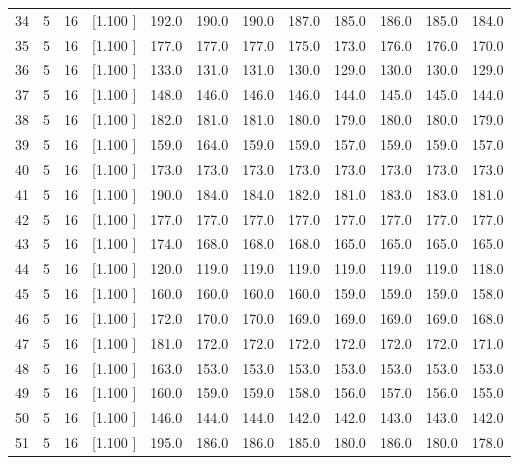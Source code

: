\documentclass[12pt,a4paper]{article}
\begin{document}
\begin{center}
{\begin{tabular}{r r r r r r r r r r r r}
  34&  5& 16&[1.100     ]&   192.0&   190.0&   190.0&   187.0&   185.0&   186.0&   185.0&   184.0\\[-0.02in]
  35&  5& 16&[1.100     ]&   177.0&   177.0&   177.0&   175.0&   173.0&   176.0&   176.0&   170.0\\[-0.02in]
  36&  5& 16&[1.100     ]&   133.0&   131.0&   131.0&   130.0&   129.0&   130.0&   130.0&   129.0\\[-0.02in]
  37&  5& 16&[1.100     ]&   148.0&   146.0&   146.0&   146.0&   144.0&   145.0&   145.0&   144.0\\[-0.02in]
  38&  5& 16&[1.100     ]&   182.0&   181.0&   181.0&   180.0&   179.0&   180.0&   180.0&   179.0\\[-0.02in]
  39&  5& 16&[1.100     ]&   159.0&   164.0&   159.0&   159.0&   157.0&   159.0&   159.0&   157.0\\[-0.02in]
  40&  5& 16&[1.100     ]&   173.0&   173.0&   173.0&   173.0&   173.0&   173.0&   173.0&   173.0\\[-0.02in]
  41&  5& 16&[1.100     ]&   190.0&   184.0&   184.0&   182.0&   181.0&   183.0&   183.0&   181.0\\[-0.02in]
  42&  5& 16&[1.100     ]&   177.0&   177.0&   177.0&   177.0&   177.0&   177.0&   177.0&   177.0\\[-0.02in]
  43&  5& 16&[1.100     ]&   174.0&   168.0&   168.0&   168.0&   165.0&   165.0&   165.0&   165.0\\[-0.02in]
  44&  5& 16&[1.100     ]&   120.0&   119.0&   119.0&   119.0&   119.0&   119.0&   119.0&   118.0\\[-0.02in]
  45&  5& 16&[1.100     ]&   160.0&   160.0&   160.0&   160.0&   159.0&   159.0&   159.0&   158.0\\[-0.02in]
  46&  5& 16&[1.100     ]&   172.0&   170.0&   170.0&   169.0&   169.0&   169.0&   169.0&   168.0\\[-0.02in]
  47&  5& 16&[1.100     ]&   181.0&   172.0&   172.0&   172.0&   172.0&   172.0&   172.0&   171.0\\[-0.02in]
  48&  5& 16&[1.100     ]&   163.0&   153.0&   153.0&   153.0&   153.0&   153.0&   153.0&   153.0\\[-0.02in]
  49&  5& 16&[1.100     ]&   160.0&   159.0&   159.0&   158.0&   156.0&   157.0&   156.0&   155.0\\[-0.02in]
  50&  5& 16&[1.100     ]&   146.0&   144.0&   144.0&   142.0&   142.0&   143.0&   143.0&   142.0\\[-0.02in]
  51&  5& 16&[1.100     ]&   195.0&   186.0&   186.0&   185.0&   180.0&   186.0&   180.0&   178.0\\[-0.02in]

\end{tabular}}
\end{center}
\end{document}
